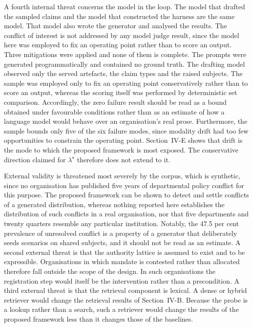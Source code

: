 \documentclass[journal]{IEEEtran}
\begin{document}
A fourth internal threat concerns the model in the loop. The model that drafted the sampled claims and the model that constructed the harness are the same model. That model also wrote the generator and analysed the results. The conflict of interest is not addressed by any model judge result, since the model here was employed to fix an operating point rather than to score an output. Three mitigations were applied and none of them is complete. The prompts were generated programmatically and contained no ground truth. The drafting model observed only the served artefacts, the claim types and the raised subjects. The sample was employed only to fix an operating point conservatively rather than to score an output, whereas the scoring itself was performed by deterministic set comparison. Accordingly, the zero failure result should be read as a bound obtained under favourable conditions rather than as an estimate of how a language model would behave over an organisation's real prose. Furthermore, the sample bounds only five of the six failure modes, since modality drift had too few opportunities to constrain the operating point. Section~IV-E shows that drift is the mode to which the proposed framework is most exposed. The conservative direction claimed for $\lambda^\star$ therefore does not extend to it.

External validity is threatened most severely by the corpus, which is synthetic, since no organisation has published five years of departmental policy conflict for this purpose. The proposed framework can be shown to detect and settle conflicts of a generated distribution, whereas nothing reported here establishes the distribution of such conflicts in a real organisation, nor that five departments and twenty quarters resemble any particular institution. Notably, the 47.5 per cent prevalence of unresolved conflict is a property of a generator that deliberately seeds scenarios on shared subjects, and it should not be read as an estimate. A second external threat is that the authority lattice is assumed to exist and to be expressible. Organisations in which mandate is contested rather than allocated therefore fall outside the scope of the design. In such organisations the registration step would itself be the intervention rather than a precondition. A third external threat is that the retrieval component is lexical. A dense or hybrid retriever would change the retrieval results of Section~IV-B. Because the probe is a lookup rather than a search, such a retriever would change the results of the proposed framework less than it changes those of the baselines.
\end{document}
